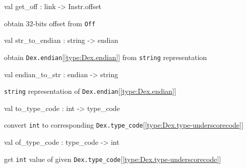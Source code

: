 \documentclass[11pt]{article}
\begin{document}
\label{val:Dex.get-underscoreoff}\begin{ocamldoccode}
val get_off : link -> Instr.offset
\end{ocamldoccode}
\begin{ocamldocdescription}
obtain 32-bits offset from {\tt{Off}}


\end{ocamldocdescription}




\label{val:Dex.str-underscoreto-underscoreendian}\begin{ocamldoccode}
val str_to_endian : string -> endian
\end{ocamldoccode}
\begin{ocamldocdescription}
obtain {\tt{Dex.endian}}[\ref{type:Dex.endian}] from {\tt{string}} representation


\end{ocamldocdescription}




\label{val:Dex.endian-underscoreto-underscorestr}\begin{ocamldoccode}
val endian_to_str : endian -> string
\end{ocamldoccode}
\begin{ocamldocdescription}
{\tt{string}} representation of {\tt{Dex.endian}}[\ref{type:Dex.endian}]


\end{ocamldocdescription}




\label{val:Dex.to-underscoretype-underscorecode}\begin{ocamldoccode}
val to_type_code : int -> type_code
\end{ocamldoccode}
\begin{ocamldocdescription}
convert {\tt{int}} to corresponding {\tt{Dex.type\_code}}[\ref{type:Dex.type-underscorecode}]


\end{ocamldocdescription}




\label{val:Dex.of-underscoretype-underscorecode}\begin{ocamldoccode}
val of_type_code : type_code -> int
\end{ocamldoccode}
\begin{ocamldocdescription}
get {\tt{int}} value of given {\tt{Dex.type\_code}}[\ref{type:Dex.type-underscorecode}]


\end{ocamldocdescription}
\end{document}
